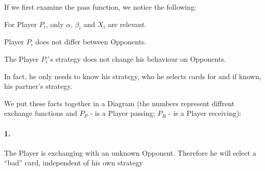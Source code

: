 If we first examine the pass function, we notice the following:\\
\begin{axioms}[(F1)]
\item For Player $P_i$, only $\alpha$, $\beta_i$ and $X_i$ are relevant.
\item Player $P_i$ does not differ between Opponents. 
\item The Player $P_i’s$ strategy does not change his behaviour on Opponents. 
\item In fact, he only needs to know his strategy, who he selects cards for and if known, his partner’s strategy. 
\end{axioms}

We put these facts together in a Diagram (the numbers represent diffrent exchange functions and $P_P$ - is a Player passing; $P_R$ - is a Player receiving):

\begin{table}[h]
\caption{Table 1.1} \bigskip
\label{tab:my-table}
\end{table}
\paragraph{1.}
The Player is exchanging with an unknown Opponent. Therefore he will select a “bad” card, independent of his own strategy
